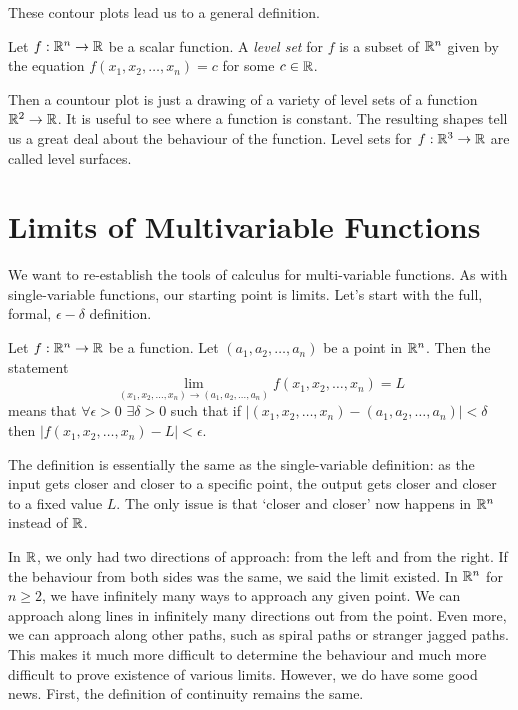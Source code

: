 \documentclass[fleqn,letterpaper]{report}
\begin{document}
These contour plots lead us to a general definition.

\begin{defn}
Let $f: \mathbb{R}^n \rightarrow \mathbb{R}$ be a scalar function. A
\emph{level set} for $f$ is a subset of $\mathbb{R}^n$ given by the
equation $f(x_1, x_2, \ldots, x_n) = c$ for some $c \in \mathbb{R}$.
\end{defn}

Then a countour plot is just a drawing of a variety of level
sets of a function $\mathbb{R}^2 \rightarrow \mathbb{R}$. It is useful to
see where a function is constant. The resulting shapes tell
us a great deal about the behaviour of the function. Level
sets for $f: \mathbb{R}^3 \rightarrow \mathbb{R}$ are called level surfaces.

\section{Limits of Multivariable Functions}
\label{limits}

We want to re-establish the tools of calculus for
multi-variable functions. As with single-variable functions,
our starting point is limits. Let's start with the full,
formal, $\epsilon-\delta$ definition.

\begin{defn}
Let $f: \mathbb{R}^n \rightarrow \mathbb{R}$ be a function. Let $(a_1, a_2,
\ldots, a_n)$ be a point in $\mathbb{R}^n$. Then the statement
\begin{equation*}
\lim_{(x_1, x_2, \ldots, x_n) \rightarrow (a_1, a_2, \ldots,
a_n)} f(x_1, x_2, \ldots, x_n) = L
\end{equation*}
means that $\forall \epsilon > 0$ $\exists \delta > 0$ such
that if $|(x_1, x_2, \ldots, x_n) - (a_1, a_2, \ldots, a_n)| <
\delta$ then $|f(x_1, x_2, \ldots, x_n) - L| < \epsilon$. 
\end{defn}

The definition is essentially the same as the single-variable
definition: as the input gets closer and closer to a specific
point, the output gets closer and closer to a fixed value $L$.
The only issue is that `closer and closer' now happens in
$\mathbb{R}^n$ instead of $\mathbb{R}$. 

In $\mathbb{R}$, we only had two directions of approach: from the left
and from the right. If the behaviour from both sides was the
same, we said the limit existed. In $\mathbb{R}^n$ for $n \geq 2$,
we have infinitely many ways to approach any given point. We
can approach along lines in infinitely many directions out from
the point. Even more, we can approach along other paths, such
as spiral paths or stranger jagged paths. This makes it much
more difficult to determine the behaviour and much
more difficult to prove existence of various limits. However,
we do have some good news. First, the definition of
continuity remains the same.
\end{document}

